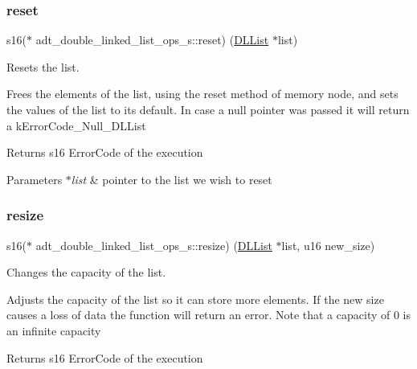 \subsubsection{\texorpdfstring{reset}{reset}}
{\footnotesize\ttfamily s16($\ast$ adt\+\_\+double\+\_\+linked\+\_\+list\+\_\+ops\+\_\+s\+::reset) (\hyperlink{structadt__double__linked__list__s}{D\+L\+List} $\ast$list)}



Resets the list. 

Frees the elements of the list, using the reset method of memory node, and sets the values of the list to it\textquotesingle{}s default. In case a null pointer was passed it will return a k\+Error\+Code\+\_\+\+Null\+\_\+\+D\+L\+List

\begin{DoxyReturn}{Returns}
s16 Error\+Code of the execution 
\end{DoxyReturn}

\begin{DoxyParams}{Parameters}
{\em $\ast$list} & pointer to the list we wish to reset \\
\hline
\end{DoxyParams}
\mbox{\label{structadt__double__linked__list__ops__s_aadb76bb9698533203350f929f21883a4}} 
\subsubsection{\texorpdfstring{resize}{resize}}
{\footnotesize\ttfamily s16($\ast$ adt\+\_\+double\+\_\+linked\+\_\+list\+\_\+ops\+\_\+s\+::resize) (\hyperlink{structadt__double__linked__list__s}{D\+L\+List} $\ast$list, u16 new\+\_\+size)}



Changes the capacity of the list. 

Adjusts the capacity of the list so it can store more elements. If the new size causes a loss of data the function will return an error. Note that a capacity of 0 is an infinite capacity

\begin{DoxyReturn}{Returns}
s16 Error\+Code of the execution 
\end{DoxyReturn}

